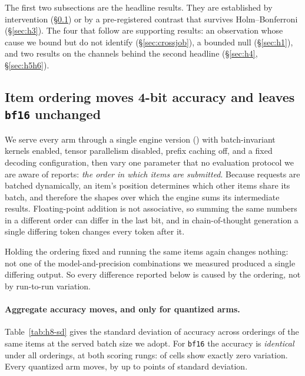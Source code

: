 \documentclass[conference]{IEEEtran}
\begin{document}
The first two subsections are the headline results. They are established by intervention
(\S\ref{sec:h8}) or by a pre-registered contrast that survives Holm--Bonferroni
(\S\ref{sec:h3}). The four that follow
are supporting results: an observation whose cause we bound but do not identify
(\S\ref{sec:crossjob}), a bounded null (\S\ref{sec:h1}), and two results on the channels
behind the second headline (\S\ref{sec:h4}, \S\ref{sec:h5h6}).

\subsection{Item ordering moves 4-bit accuracy and leaves \texttt{bf16} unchanged}
\label{sec:h8}


We serve every arm through a single engine version (\hEightEngine) with
batch-invariant kernels enabled, tensor parallelism disabled, prefix caching
off, and a fixed decoding configuration, then vary one parameter that no
evaluation protocol we are aware of reports: \emph{the order in which items are
submitted}. Because requests are batched dynamically, an item's position determines which other
items share its batch, and therefore the shapes over which the engine sums its
intermediate results. Floating-point addition is not associative, so summing the same
numbers in a different order can differ in the last bit, and in chain-of-thought
generation a single differing token changes every token after it.

Holding the ordering fixed and running the same items again changes nothing: not one
of the \hEightNCells{} model-and-precision combinations we measured produced a single
differing output. So every difference reported below is caused by the ordering, not by
run-to-run variation.

\paragraph{Aggregate accuracy moves, and only for quantized arms.}
Table~\ref{tab:h8-sd} gives the standard deviation of accuracy across
\hEightSDOrderings{} orderings of the same \hEightItems{} items at the served
batch size we adopt. For \texttt{bf16} the accuracy is \emph{identical} under all
\hEightSDOrderings{} orderings, at both scoring rungs: \hEightBFTenZero{} of
\hEightBFTenCells{} cells show exactly zero variation. Every quantized arm moves,
by up to \hEightWorstSDTen{} points of standard deviation.
\end{document}
